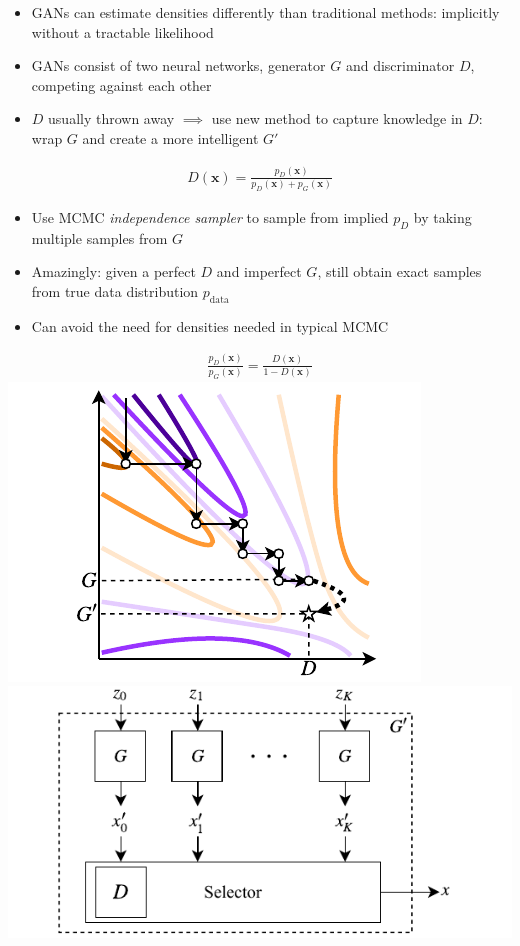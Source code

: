 \documentclass[a0,landscape]{a0poster}
\renewcommand{\vec}[1]{{\boldsymbol{\mathbf{#1}}}} %
\newcommand{\PG}{{p_G}}
\newcommand{\PD}{{p_D}}
\newcommand{\PR}{{p_{\textrm{data}}}}
\begin{document}
\begin{multicols}{3}
\begin{itemize}
  \item GANs can estimate densities differently than traditional methods: implicitly without a tractable likelihood
  \item GANs consist of two neural networks, generator $G$ and discriminator $D$, competing against each other
  \item $D$ usually thrown away $\implies$ use new method to capture knowledge in $D$: wrap $G$ and create a more intelligent $G'$
\end{itemize}
%
\begin{align}
  D(\vec x) = \frac{\PD(\vec x)}{\PD(\vec x) + \PG(\vec x)}
\end{align}
%
\begin{itemize}
  \item Use MCMC \emph{independence sampler} to sample from implied $\PD$ by taking multiple samples from $G$
  \item Amazingly: given a perfect $D$ and imperfect $G$, still obtain exact samples from true data distribution $\PR$
  \item Can avoid the need for densities needed in typical MCMC
\end{itemize}
%
\begin{align}
  \frac{\PD(\vec x)}{\PG(\vec x)} = \frac{D(\vec x)}{1 - D(\vec x)}
\end{align}
%
\includegraphics[scale=2.5]{../figures/coord_descent.pdf}
\includegraphics[scale=2.5]{../figures/block_diag.pdf}


\end{multicols}
\end{document}
